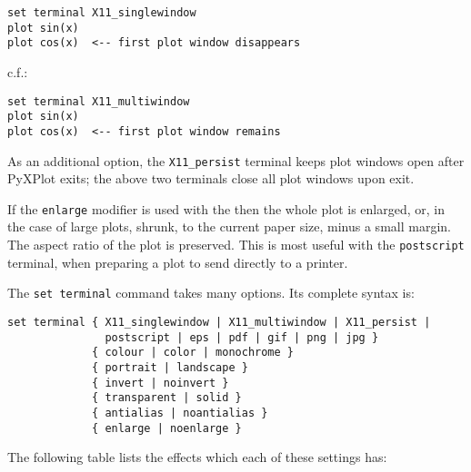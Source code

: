 \begin{verbatim} 
set terminal X11_singlewindow
plot sin(x)
plot cos(x)  <-- first plot window disappears
\end{verbatim}

\noindent c.f.:

\begin{verbatim} 
set terminal X11_multiwindow
plot sin(x)
plot cos(x)  <-- first plot window remains
\end{verbatim}

As an additional option, the {\tt X11\_persist} terminal keeps plot windows
open after PyXPlot exits; the above two terminals close all plot windows upon
exit.

If the {\tt enlarge} modifier is used with the  then the
whole plot is enlarged, or, in the case of large plots, shrunk, to the current
paper size, minus a small margin. The aspect ratio of the plot is preserved.
This is most useful with the {\tt postscript} terminal, when preparing a plot
to send directly to a printer.

The {\tt set terminal} command takes many options. Its complete syntax is:

\begin{verbatim} 
set terminal { X11_singlewindow | X11_multiwindow | X11_persist |
               postscript | eps | pdf | gif | png | jpg }
             { colour | color | monochrome }
             { portrait | landscape }
             { invert | noinvert }
             { transparent | solid }
             { antialias | noantialias }
             { enlarge | noenlarge }
\end{verbatim}

The following table lists the effects which each of these settings has:

\newpage %


